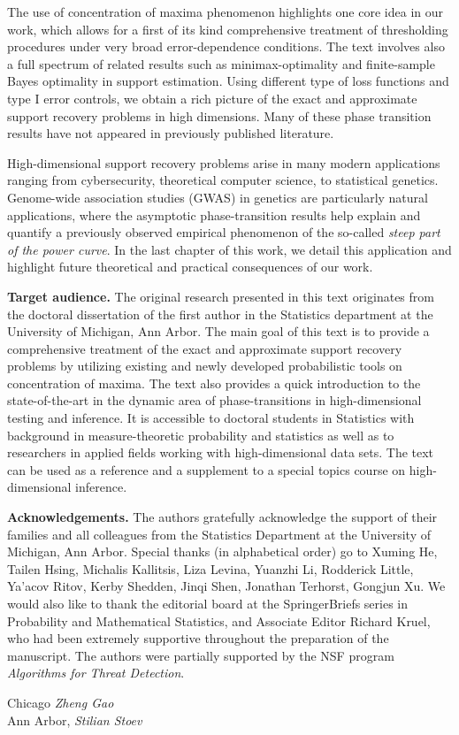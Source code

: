 The use of concentration of maxima phenomenon highlights one core idea in our work, which allows for a first of its kind comprehensive 
treatment of thresholding procedures under very broad error-dependence conditions.  The text involves also a full spectrum of related results 
such as minimax-optimality and finite-sample Bayes optimality in support estimation.  Using different type of loss functions and type I error 
controls, we obtain a rich picture of the exact and approximate support recovery problems in high dimensions.  
Many of these phase transition results have not appeared in previously published literature.  

High-dimensional support recovery problems arise in many modern applications ranging from cybersecurity, theoretical computer science,
to statistical genetics.  Genome-wide association studies (GWAS) in genetics are particularly natural applications, where the asymptotic 
phase-transition results help explain and quantify a previously observed empirical phenomenon of the so-called {\em steep part of the power 
curve}.  In the last chapter of this work, we detail this application and highlight future theoretical and practical consequences of our work.


{\bf Target audience.} The original research presented in this text originates from the doctoral dissertation of the first author in the Statistics department at the University of Michigan, Ann Arbor.  The main goal of this text is to provide a comprehensive treatment of the exact and approximate support recovery problems by utilizing existing and newly developed probabilistic tools on concentration of maxima.
The text also provides a quick introduction to the state-of-the-art in the dynamic area of phase-transitions in high-dimensional testing and inference.
It is accessible to doctoral students in Statistics with background in measure-theoretic probability and statistics as well as to researchers in applied fields working with high-dimensional data sets.  The text can be used as a reference and a supplement to a special topics course on high-dimensional inference.

{\bf Acknowledgements.} The authors gratefully acknowledge the support of their families and all colleagues from the Statistics Department at the University of Michigan, Ann Arbor.
Special thanks (in alphabetical order) go to Xuming He, Tailen Hsing, Michalis Kallitsis, Liza Levina, Yuanzhi Li, Rodderick Little, Ya'acov Ritov, Kerby Shedden, Jinqi Shen, Jonathan Terhorst, Gongjun Xu.
We would also like to thank the editorial board at the SpringerBriefs series in Probability and Mathematical Statistics, and Associate Editor Richard Kruel, who had been extremely supportive throughout the preparation of the manuscript.
The authors were partially supported by the NSF program {\em Algorithms for Threat Detection}.




\vspace{\baselineskip}
\begin{flushright}\noindent
Chicago \hfill {\it Zheng Gao }\\
Ann Arbor, \DateEdited \hfill {\it Stilian Stoev}\\
\end{flushright}


